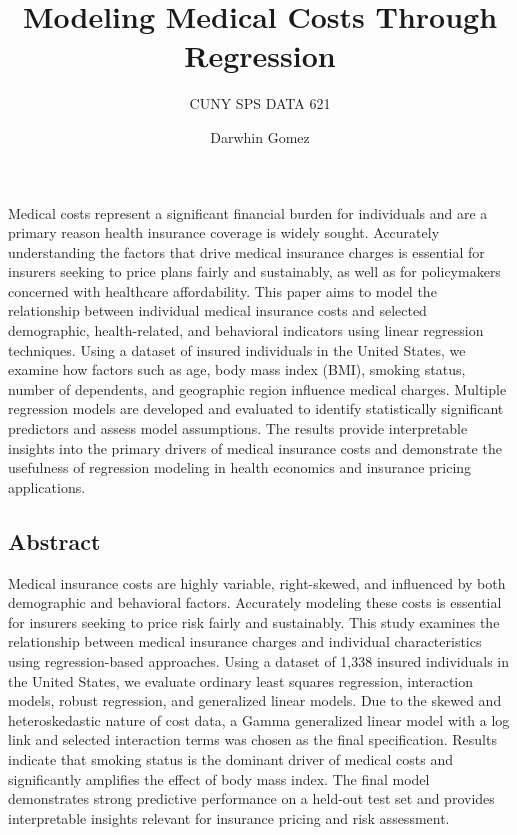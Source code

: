 \documentclass[
  letterpaper,
  DIV=11,
  numbers=noendperiod]{scrartcl}
\title{Modeling Medical Costs Through Regression}
\subtitle{CUNY SPS DATA 621}
\author{Darwhin Gomez}
\date{}
\renewcommand*\contentsname{Table of contents}
\newcommand\contentsname{Table of contents}
\begin{document}
\maketitle

\renewcommand*\contentsname{Table of contents}
{
\hypersetup{linkcolor=}
\setcounter{tocdepth}{3}
\tableofcontents
}

Medical costs represent a significant financial burden for individuals
and are a primary reason health insurance coverage is widely sought.
Accurately understanding the factors that drive medical insurance
charges is essential for insurers seeking to price plans fairly and
sustainably, as well as for policymakers concerned with healthcare
affordability. This paper aims to model the relationship between
individual medical insurance costs and selected demographic,
health-related, and behavioral indicators using linear regression
techniques. Using a dataset of insured individuals in the United States,
we examine how factors such as age, body mass index (BMI), smoking
status, number of dependents, and geographic region influence medical
charges. Multiple regression models are developed and evaluated to
identify statistically significant predictors and assess model
assumptions. The results provide interpretable insights into the primary
drivers of medical insurance costs and demonstrate the usefulness of
regression modeling in health economics and insurance pricing
applications.

\subsection{\texorpdfstring{\textbf{Abstract}}{Abstract}}\label{abstract}

Medical insurance costs are highly variable, right-skewed, and
influenced by both demographic and behavioral factors. Accurately
modeling these costs is essential for insurers seeking to price risk
fairly and sustainably. This study examines the relationship between
medical insurance charges and individual characteristics using
regression-based approaches. Using a dataset of 1,338 insured
individuals in the United States, we evaluate ordinary least squares
regression, interaction models, robust regression, and generalized
linear models. Due to the skewed and heteroskedastic nature of cost
data, a Gamma generalized linear model with a log link and selected
interaction terms was chosen as the final specification. Results
indicate that smoking status is the dominant driver of medical costs and
significantly amplifies the effect of body mass index. The final model
demonstrates strong predictive performance on a held-out test set and
provides interpretable insights relevant for insurance pricing and risk
assessment.
\end{document}
